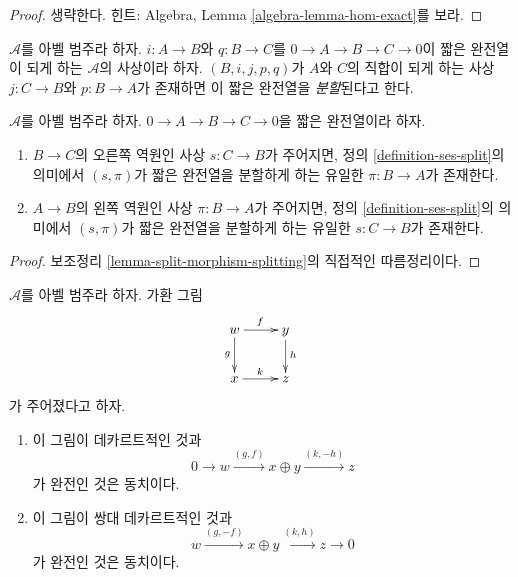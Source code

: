 \begin{proof}
생략한다. 힌트: Algebra, Lemma \ref{algebra-lemma-hom-exact}를 보라.
\end{proof}

\begin{definition}
\label{definition-ses-split}
$\mathcal{A}$를 아벨 범주라 하자. $i : A \to B$와 $q : B \to C$를
$0 \to A \to B \to C \to 0$이 짧은 완전열이 되게 하는 $\mathcal{A}$의
사상이라 하자. $(B, i, j, p, q)$가 $A$와 $C$의 직합이 되게 하는
사상 $j : C \to B$와
$p : B \to A$가 존재하면 이 짧은 완전열을 {\it 분할}된다고 한다.
\end{definition}

\begin{lemma}
\label{lemma-ses-split}
$\mathcal{A}$를 아벨 범주라 하자.
$0 \to A \to B \to C \to 0$을 짧은 완전열이라 하자.
\begin{enumerate}
\item $B \to C$의 오른쪽 역원인 사상 $s : C \to B$가 주어지면,
정의 \ref{definition-ses-split}의 의미에서 $(s, \pi)$가 짧은 완전열을
분할하게 하는 유일한 $\pi : B \to A$가 존재한다.
\item $A \to B$의 왼쪽 역원인 사상 $\pi : B \to A$가 주어지면,
정의 \ref{definition-ses-split}의 의미에서 $(s, \pi)$가 짧은 완전열을
분할하게 하는 유일한 $s : C \to B$가 존재한다.
\end{enumerate}
\end{lemma}

\begin{proof}
보조정리 \ref{lemma-split-morphism-splitting}의 직접적인 따름정리이다.
\end{proof}

\begin{lemma}
\label{lemma-characterize-cartesian}
$\mathcal{A}$를 아벨 범주라 하자. 가환 그림
$$
\xymatrix{
w\ar[r]^f\ar[d]_g
& y\ar[d]^h\\
x\ar[r]^k
& z
}
$$
가 주어졌다고 하자.
\begin{enumerate}
\item 이 그림이 데카르트적인 것과
$$
0 \to w \xrightarrow{(g, f)} x \oplus y \xrightarrow{(k, -h)} z
$$
가 완전인 것은 동치이다.
\item 이 그림이 쌍대 데카르트적인 것과
$$
w \xrightarrow{(g, -f)} x \oplus y \xrightarrow{(k, h)} z \to 0
$$
가 완전인 것은 동치이다.
\end{enumerate}
\end{lemma}

